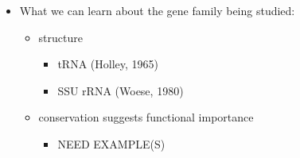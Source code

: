 \documentclass[landscape]{slides}
\begin{document}
\begin{slide}


\vfill
\end{slide}
\begin{slide}


\small
\begin{itemize}
\item What we can learn about the gene family being studied:
  \begin{itemize}
  \item structure
    \begin{itemize}
    \item tRNA (Holley, 1965)
    \item SSU rRNA (Woese, 1980)
    \end{itemize}
  \item conservation suggests functional importance
    \begin{itemize}
    \item NEED EXAMPLE(S)
    \end{itemize}
  \end{itemize}
\end{itemize}

\vfill
\end{slide}
\begin{slide}
\end{slide}
\end{document}
